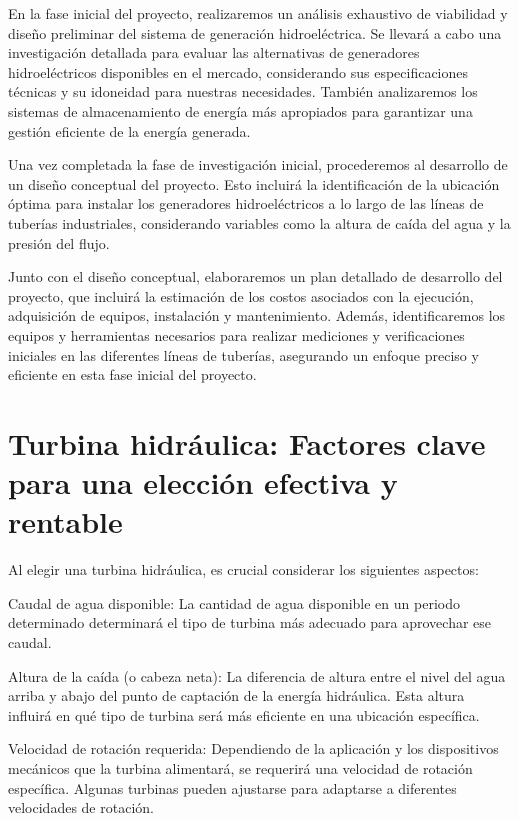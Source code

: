 \documentclass[journal]{IEEEtran}
\begin{document}
En la fase inicial del proyecto, realizaremos un análisis exhaustivo de viabilidad y diseño preliminar del sistema de generación hidroeléctrica. Se llevará a cabo una investigación detallada para evaluar las alternativas de generadores hidroeléctricos disponibles en el mercado, considerando sus especificaciones técnicas y su idoneidad para nuestras necesidades. También analizaremos los sistemas de almacenamiento de energía más apropiados para garantizar una gestión eficiente de la energía generada.

Una vez completada la fase de investigación inicial, procederemos al desarrollo de un diseño conceptual del proyecto. Esto incluirá la identificación de la ubicación óptima para instalar los generadores hidroeléctricos a lo largo de las líneas de tuberías industriales, considerando variables como la altura de caída del agua y la presión del flujo.

Junto con el diseño conceptual, elaboraremos un plan detallado de desarrollo del proyecto, que incluirá la estimación de los costos asociados con la ejecución, adquisición de equipos, instalación y mantenimiento. Además, identificaremos los equipos y herramientas necesarios para realizar mediciones y verificaciones iniciales en las diferentes líneas de tuberías, asegurando un enfoque preciso y eficiente en esta fase inicial del proyecto.


\section{Turbina hidráulica: Factores clave para una elección efectiva y rentable}

Al elegir una turbina hidráulica, es crucial considerar los siguientes aspectos:

Caudal de agua disponible: La cantidad de agua disponible en un periodo determinado determinará el tipo de turbina más adecuado para aprovechar ese caudal.

Altura de la caída (o cabeza neta): La diferencia de altura entre el nivel del agua arriba y abajo del punto de captación de la energía hidráulica. Esta altura influirá en qué tipo de turbina será más eficiente en una ubicación específica.

Velocidad de rotación requerida: Dependiendo de la aplicación y los dispositivos mecánicos que la turbina alimentará, se requerirá una velocidad de rotación específica. Algunas turbinas pueden ajustarse para adaptarse a diferentes velocidades de rotación.
\end{document}
